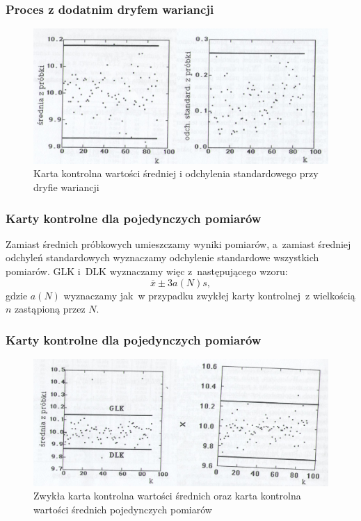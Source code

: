 \documentclass[11pt,usenames,dvipsnames,svgnames,x11names]{beamer}
\theoremstyle{plain}
\theoremstyle{definition}
\theoremstyle{remark}
\begin{document}
\begin{frame} 
\frametitle{Proces z dodatnim dryfem wariancji}

\begin{center}
	\begin{figure}[htbp]
			\includegraphics[width=\textwidth]{obr3.png}
			\caption{Karta kontrolna wartości średniej i odchylenia standardowego przy dryfie wariancji}
	\end{figure}
\end{center}
\end{frame}

\begin{frame}
\frametitle{Karty kontrolne dla pojedynczych pomiarów}

Zamiast średnich próbkowych umieszczamy wyniki pomiarów, a~zamiast średniej odchyleń standardowych wyznaczamy odchylenie standardowe wszystkich pomiarów. GLK i~DLK wyznaczamy więc z~następującego wzoru:
$$\overline{x}\pm3a(N)s,$$
gdzie $a(N)$ wyznaczamy jak~w przypadku zwykłej karty kontrolnej~z wielkością $n$ zastąpioną przez $N$.

\end{frame}

\begin{frame}
\frametitle{Karty kontrolne dla pojedynczych pomiarów}
\begin{center}
	\begin{figure}[htbp]
			\includegraphics[width=\textwidth]{obr4.png}
			\caption{Zwykła karta kontrolna wartości średnich oraz karta kontrolna wartości średnich pojedynczych pomiarów}
	\end{figure}
\end{center}
\end{frame}
\end{document}

